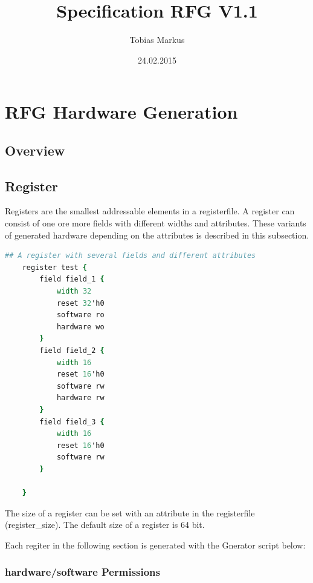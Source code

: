 \documentclass[12pt,a4paper]{article}
\begin{document}
\title{Specification RFG V1.1}
\author{Tobias Markus}
\date{24.02.2015}

\maketitle

\tableofcontents
\newpage

\section{RFG Hardware Generation}

\subsection{Overview}
\newpage
\subsection{Register}
Registers are the smallest addressable elements in a registerfile. A register can consist of one ore more fields with different widths and attributes. These variants of generated hardware depending on the attributes is described in this subsection. 

\begin{lstlisting}[linewidth=\textwidth,language=tcl,basicstyle=\small,tabsize=4]
    ## A register with several fields and different attributes
    register test {
        field field_1 {
            width 32
            reset 32'h0
            software ro
            hardware wo
        }
        field field_2 {
            width 16
            reset 16'h0
            software rw
            hardware rw
        }
        field field_3 {
            width 16
            reset 16'h0
            software rw
        }

    }
\end{lstlisting}

The size of a register can be set with an attribute in the registerfile (register\_size). The default size of a register is 64 bit.

Each regiter in the following section is generated with the Gnerator script below:



\newpage

\subsubsection{hardware/software Permissions}
\end{document}
